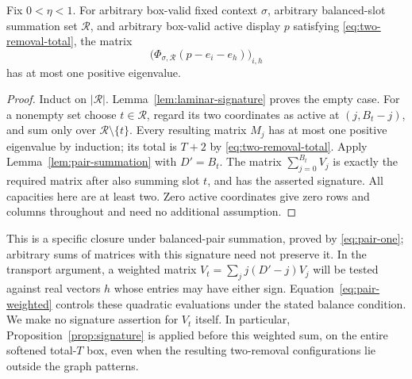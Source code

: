\begin{proposition}
\label{prop:signature}
Fix $0<\eta<1$.  For arbitrary box-valid fixed context $\sigma$,
arbitrary balanced-slot summation set $\mathcal R$, and arbitrary
box-valid active display $p$ satisfying \eqref{eq:two-removal-total},
the matrix
\[
 \bigl(\Phi_{\sigma,\mathcal R}(p-e_i-e_h)\bigr)_{i,h}
\]
has at most one positive eigenvalue.
\end{proposition}
\begin{proof}
Induct on $|\mathcal R|$.  Lemma~\ref{lem:laminar-signature} proves
the empty case.  For a nonempty set choose $t\in\mathcal R$, regard
its two coordinates as active at $(j,B_t-j)$, and sum only over
$\mathcal R\setminus\{t\}$.  Every resulting matrix $M_j$ has at most
one positive eigenvalue by induction; its total is $T+2$ by
\eqref{eq:two-removal-total}.  Apply Lemma~\ref{lem:pair-summation}
with $D'=B_t$.  The matrix $\sum_{j=0}^{B_t}V_j$ is exactly the required
matrix after also summing slot $t$, and has the asserted signature.
All capacities here are at least two.  Zero active coordinates give
zero rows and columns throughout and need no additional assumption.
\end{proof}

This is a specific closure under balanced-pair summation, proved by
\eqref{eq:pair-one}; arbitrary sums of matrices with this signature
need not preserve it.  In the transport argument, a weighted matrix
$V_t=\sum_j j(D'-j)V_j$ will be tested against real vectors $h$ whose
entries may have either sign.  Equation~\eqref{eq:pair-weighted}
controls these quadratic evaluations under the stated balance condition.
We make no signature assertion for $V_t$ itself.  In particular,
Proposition~\ref{prop:signature} is applied before this weighted sum,
on the entire softened total-$T$ box, even when the resulting
two-removal configurations lie outside the graph patterns.
